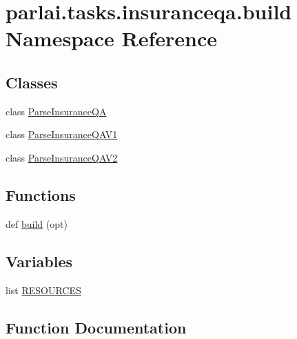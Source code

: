 \hypertarget{namespaceparlai_1_1tasks_1_1insuranceqa_1_1build}{}\section{parlai.\+tasks.\+insuranceqa.\+build Namespace Reference}
\label{namespaceparlai_1_1tasks_1_1insuranceqa_1_1build}
\subsection*{Classes}
\begin{DoxyCompactItemize}
\item 
class \hyperlink{classparlai_1_1tasks_1_1insuranceqa_1_1build_1_1ParseInsuranceQA}{Parse\+Insurance\+QA}
\item 
class \hyperlink{classparlai_1_1tasks_1_1insuranceqa_1_1build_1_1ParseInsuranceQAV1}{Parse\+Insurance\+Q\+A\+V1}
\item 
class \hyperlink{classparlai_1_1tasks_1_1insuranceqa_1_1build_1_1ParseInsuranceQAV2}{Parse\+Insurance\+Q\+A\+V2}
\end{DoxyCompactItemize}
\subsection*{Functions}
\begin{DoxyCompactItemize}
\item 
def \hyperlink{namespaceparlai_1_1tasks_1_1insuranceqa_1_1build_ae48219c5a8158e6688a2b3dba93a99a2}{build} (opt)
\end{DoxyCompactItemize}
\subsection*{Variables}
\begin{DoxyCompactItemize}
\item 
list \hyperlink{namespaceparlai_1_1tasks_1_1insuranceqa_1_1build_ab0ec3ef6da60bb6f79d7345f2fe18985}{R\+E\+S\+O\+U\+R\+C\+ES}
\end{DoxyCompactItemize}


\subsection{Function Documentation}
\mbox{\label{namespaceparlai_1_1tasks_1_1insuranceqa_1_1build_ae48219c5a8158e6688a2b3dba93a99a2}} 
